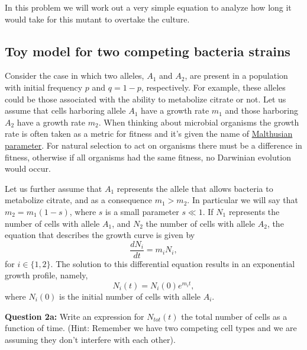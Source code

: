 \documentclass[12pt]{article}    %
\begin{document}
In this problem we will work out a very simple equation to analyze how long
it would take for this mutant to overtake the culture.

\subsection{Toy model for two competing bacteria strains}

Consider the case in which two alleles, $A_1$ and $A_2$, are present in a
population with initial frequency $p$ and $q = 1 - p$, respectively. For example, these
alleles could be those associated with the ability to metabolize citrate or not.
 Let us assume that cells harboring allele $A_1$ have a growth rate
$m_1$ and those harboring $A_2$ have a growth rate $m_2$.  When thinking
about
microbial organisms the growth rate is often taken as a metric for fitness and it's
given the name of
\href{http://mathworld.wolfram.com/MalthusianParameter.html}{Malthusian
parameter}. For natural selection to act on organisms there must be a difference
in fitness, otherwise if all organisms had the same fitness, no Darwinian
evolution would occur.

Let us further assume that $A_1$ represents the allele that allows bacteria to
metabolize citrate, and as a consequence $m_1 > m_2$. In particular we will say
that $m_2 = m_1 (1 - s)$, where $s$ is a small parameter $s \ll 1$. If $N_1$ represents the number
of cells with allele $A_1$, and $N_2$ the number of cells with allele $A_2$, the
equation that describes the growth curve is given by
\begin{equation}
	\frac{dN_i}{dt} = m_i N_i,
\end{equation}
for $i \in \{1, 2\}$. The solution to this differential equation results in
an exponential growth profile, namely,
\begin{equation}\label{eq_n_t}
	N_i(t) = N_i (0) e^{m_i t},
\end{equation}
where $N_i(0)$ is the initial number of cells with allele $A_i$.

\vspace{5mm}
\textbf{Question 2a:} Write an expression for $N_{tot}(t)$ the total number of
cells as a function of time. (Hint: Remember we have two competing cell types
and we are assuming they don't interfere with each other).
\vspace{5mm}
\end{document}
